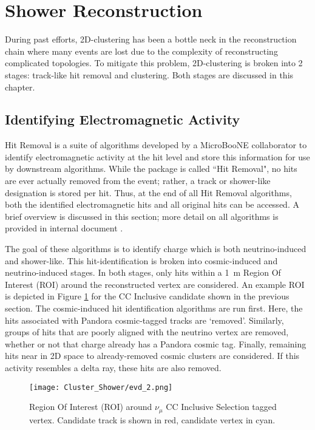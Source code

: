 \clearpage
\section{Shower Reconstruction}
During past efforts, 2D-clustering has been a bottle neck in the reconstruction chain where many events are lost due to the complexity of reconstructing complicated topologies. To mitigate this problem, 2D-clustering is broken into 2 stages: track-like hit removal and clustering. Both stages are discussed in this chapter.

\subsection{Identifying Electromagnetic Activity}
Hit Removal is a suite of algorithms developed by a MicroBooNE collaborator to identify electromagnetic activity at the hit level and store this information for use by downstream algorithms. While the package is called ``Hit Removal", no hits are ever actually removed from the event; rather, a track or shower-like designation is stored per hit. Thus, at the end of all Hit Removal algorithms, both the identified electromagnetic hits and all original hits can be accessed. A brief overview is discussed in this section; more detail on all algorithms is provided in internal document \cite{bib:davidc_hitremoval}.

\par The goal of these algorithms is to identify charge which is both neutrino-induced and shower-like. This hit-identification is broken into cosmic-induced and neutrino-induced stages.  In both stages, only hits within a 1~m Region Of Interest (ROI) around the reconstructed vertex are considered. An example ROI is depicted in Figure \ref{fig:roi} for the CC Inclusive candidate shown in the previous section. The cosmic-induced hit identification algorithms are run first.  Here, the hits associated with Pandora cosmic-tagged tracks are `removed'.  Similarly, groups of hits that are poorly aligned with the neutrino vertex are removed, whether or not that charge already has a Pandora cosmic tag. Finally, remaining hits near in 2D space to already-removed cosmic clusters are considered. If this activity resembles a delta ray, these hits are also removed. 

\begin{figure}[h!]
\centering
\texttt{[image: Cluster\_Shower/evd\_2.png]}
\caption{Region Of Interest (ROI) around $\nu_\mu$ CC Inclusive Selection tagged  vertex. Candidate track is shown in red, candidate vertex in cyan. }
\label{fig:roi}
\end{figure}

